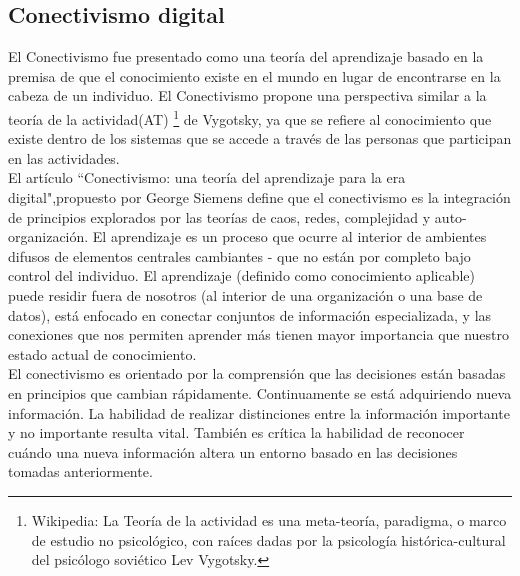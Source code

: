\subsection{Conectivismo digital}
El Conectivismo fue presentado como una teor\'ia del aprendizaje basado en la premisa de que el conocimiento existe en el 
mundo en lugar de encontrarse en la cabeza de un individuo. El Conectivismo propone una perspectiva similar a la teor\'ia 
de la actividad(AT) \footnote{Wikipedia: La Teor\'ia de la actividad es una meta-teor\'ia, paradigma, o marco de estudio no 
psicol\'ogico, con ra\'ices dadas por la psicolog\'ia hist\'orica-cultural del psic\'ologo sovi\'etico Lev Vygotsky.} 
de Vygotsky, ya que se refiere al conocimiento que existe dentro de los sistemas que se accede a trav\'es de las
personas que participan en las actividades.\\
El art\'iculo ``Conectivismo: una teor\'ia del aprendizaje para la era digital",propuesto por George Siemens 
\cite{Conetivismo} define que 
el conectivismo es la integraci\'on de principios explorados por las teor\'ias de caos, redes, complejidad y auto-organizaci\'on.
El aprendizaje es un proceso que ocurre al interior de ambientes difusos de elementos centrales cambiantes - que no est\'an 
por completo bajo control del individuo. El aprendizaje (definido como conocimiento aplicable) puede residir fuera de 
nosotros (al interior de una organizaci\'on o una base de datos), est\'a enfocado en conectar conjuntos de informaci\'on 
especializada, y las conexiones que nos permiten aprender m\'as tienen mayor importancia que nuestro estado actual de 
conocimiento.\\

El conectivismo es orientado por la comprensi\'on que las decisiones est\'an basadas en principios que cambian r\'apidamente. 
Continuamente se est\'a adquiriendo nueva informaci\'on. La habilidad de realizar distinciones entre la informaci\'on 
importante y no importante resulta vital. Tambi\'en es cr\'itica la habilidad de reconocer cu\'ando una nueva informaci\'on
altera un entorno basado en las decisiones tomadas anteriormente.\\

